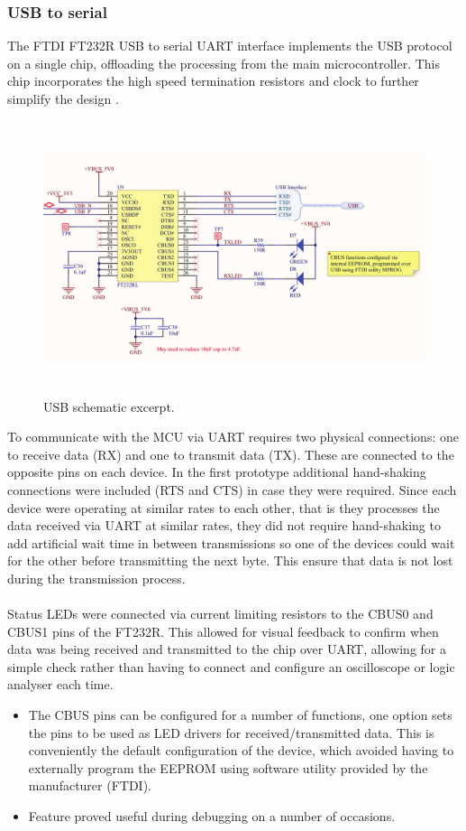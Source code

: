 \subsubsection{USB to serial}
The FTDI FT232R USB to serial UART interface implements the USB protocol on a single chip, offloading the processing from the main microcontroller. This chip incorporates the high speed termination resistors and clock to further simplify the design \cite{ft232r}.
\begin{figure}
    \centering
    \includegraphics[height = 8cm]{figures/hardware/usb_schematic.pdf}
    \caption{USB schematic excerpt.}
    \label{fig:usb_schematic}
\end{figure}
To communicate with the MCU via UART requires two physical connections: one to receive data (RX) and one to transmit data (TX). These are connected to the opposite pins on each device. In the first prototype additional hand-shaking connections were included (RTS and CTS) in case they were required. Since each device were operating at similar rates to each other, that is they processes the data received via UART at similar rates, they did not require hand-shaking to add artificial wait time in between transmissions so one of the devices could wait for the other before transmitting the next byte. This ensure that data is not lost during the transmission process. 
\\ \\
Status LEDs were connected via current limiting resistors to the CBUS0 and CBUS1 pins of the FT232R. This allowed for visual feedback to confirm when data was being received and transmitted to the chip over UART, allowing for a simple check rather than having to connect and configure an oscilloscope or logic analyser each time.
\begin{itemize}
    \item The CBUS pins can be configured for a number of functions, one option sets the pins to be used as LED drivers for received/transmitted data. This is conveniently the default configuration of the device, which avoided having to externally program the EEPROM using software utility provided by the manufacturer (FTDI).
    \item Feature proved useful during debugging on a number of occasions.
\end{itemize}

